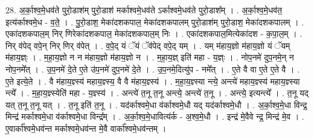 \documentclass[17pt]{extarticle}
\begin{document}
28. अ॒र्का॒श्व॒मे॒धव॑ते पुरो॒डाश॑म् पुरो॒डाश॑ मर्काश्वमे॒धव॑ते ऽर्काश्वमे॒धव॑ते पुरो॒डाश᳚म् । . अ॒र्का॒श्व॒मे॒धव॑त॒ इत्य॑र्काश्वमे॒ध - व॒ते॒ । . पु॒रो॒डाश॒ मेका॑दशकपाल॒ मेका॑दशकपालम् पुरो॒डाश॑म् पुरो॒डाश॒ मेका॑दशकपालम् । . एका॑दशकपाल॒म् निर् णिरेका॑दशकपाल॒ मेका॑दशकपाल॒म् निः । . एका॑दशकपाल॒मित्येका॑दश - क॒पा॒ल॒म् । . निर् व॑पेद् वपे॒न् निर् णिर् व॑पेत् । . व॒पे॒द् यं ॅयं ॅव॑पेद् वपे॒द् यम् । . यम् म॑हाय॒ज्ञो म॑हाय॒ज्ञो यं ॅयम् म॑हाय॒ज्ञ्ः । . म॒हा॒य॒ज्ञो न न म॑हाय॒ज्ञो म॑हाय॒ज्ञो न । . म॒हा॒य॒ज्ञ् इति॑ महा - य॒ज्ञ्ः । . नोप॒नमे॑ दुप॒नमे॒न् न नोप॒नमे᳚त् । . उ॒प॒नमे॑ दे॒ते ए॒ते उ॑प॒नमे॑ दुप॒नमे॑ दे॒ते । . उ॒प॒नमे॒दित्यु॑प - नमे᳚त् । . ए॒ते वै वा ए॒ते ए॒ते वै । . ए॒ते इत्ये॒ते । . वै म॑हाय॒ज्ञ्स्य॑ महाय॒ज्ञ्स्य॒ वै वै म॑हाय॒ज्ञ्स्य॑ । . म॒हा॒य॒ज्ञ्स्या न्त्ये॒ अन्त्ये॑ महाय॒ज्ञ्स्य॑ महाय॒ज्ञ्स्या न्त्ये᳚ । . म॒हा॒य॒ज्ञ्स्येति॑ महा - य॒ज्ञ्स्य॑ । . अन्त्ये॑ त॒नू त॒नू अन्त्ये॒ अन्त्ये॑ त॒नू । . अन्त्ये॒ इत्यन्त्ये᳚ । . त॒नू यद् यत् त॒नू त॒नू यत् । . त॒नू इति॑ त॒नू । . यद॑र्काश्वमे॒धा व॑र्काश्वमे॒धौ यद् यद॑र्काश्वमे॒धौ । . अ॒र्का॒श्व॒मे॒धा विन्द्र॒ मिन्द्र॑ मर्काश्वमे॒धा व॑र्काश्वमे॒धा विन्द्र᳚म् । . अ॒र्का॒श्व॒मे॒धावित्य॑र्क - अ॒श्व॒मे॒धौ । . इन्द्र॑ मे॒वैवे न्द्र॒ मिन्द्र॑ मे॒व । . ए॒वार्का᳚श्वमे॒धव॑न्त मर्काश्वमे॒धव॑न्त मे॒वै वार्का᳚श्वमे॒धव॑न्तम् । \newline
\end{document}
